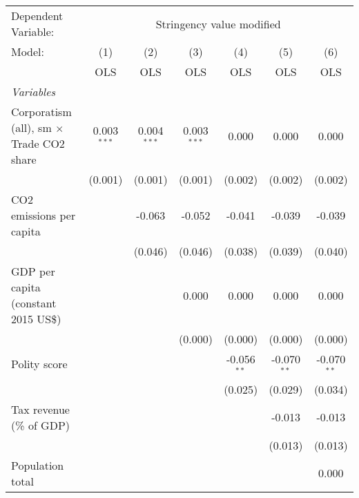 
\begingroup
\centering
\begin{tabular}{lcccccc}
   \toprule
   Dependent Variable: & \multicolumn{6}{c}{Stringency value modified}\\
   Model:                                          & (1)           & (2)           & (3)           & (4)           & (5)           & (6)\\  
                                                   &  OLS          & OLS           & OLS           & OLS           & OLS           & OLS\\  
   \midrule
   \emph{Variables}\\
   Corporatism (all), sm $\times$ Trade CO2 share  & 0.003$^{***}$ & 0.004$^{***}$ & 0.003$^{***}$ & 0.000         & 0.000         & 0.000\\   
                                                   & (0.001)       & (0.001)       & (0.001)       & (0.002)       & (0.002)       & (0.002)\\   
   CO2 emissions per capita                        &               & -0.063        & -0.052        & -0.041        & -0.039        & -0.039\\   
                                                   &               & (0.046)       & (0.046)       & (0.038)       & (0.039)       & (0.040)\\   
   GDP per capita (constant 2015 US\$)             &               &               & 0.000         & 0.000         & 0.000         & 0.000\\   
                                                   &               &               & (0.000)       & (0.000)       & (0.000)       & (0.000)\\   
   Polity score                                    &               &               &               & -0.056$^{**}$ & -0.070$^{**}$ & -0.070$^{**}$\\   
                                                   &               &               &               & (0.025)       & (0.029)       & (0.034)\\   
   Tax revenue (\% of GDP)                         &               &               &               &               & -0.013        & -0.013\\   
                                                   &               &               &               &               & (0.013)       & (0.013)\\   
   Population total                                &               &               &               &               &               & 0.000\\   

\end{tabular}

